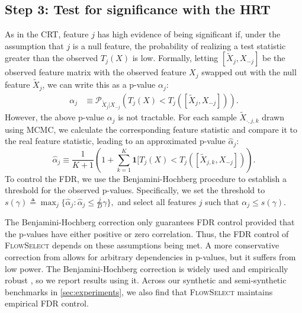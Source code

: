 \documentclass{article}
\newcommand{\FlowSelect}{\textsc{FlowSelect}\xspace}
\begin{document}
\subsection*{Step 3: Test for significance with the HRT}
As in the CRT, feature $j$ has high evidence of being significant if,
under the assumption that $j$ is a null feature,
the probability of realizing a test statistic greater than the observed $T_j(X)$ is low.
Formally, letting \([\tilde X_j, X_{-j}]\) be the observed feature matrix with the observed feature $X_j$ swapped out with the null feature $\tilde X_j$, we can write this as a p-value $\alpha_j$:
\begin{equation} \label{eq:p_value}
\begin{split}
      \alpha_{j} &\equiv \mathcal P_{\tilde X_j | X_{-j}} \left (T_{j}(X) < T_{j} ([\tilde X_j, X_{-j}])\right).
\end{split}
\end{equation}
However, the above p-value $\alpha_j$ is not tractable.
For each sample $\tilde X_{\cdot, j, k}$ drawn using MCMC, we calculate the corresponding feature statistic
and compare it to the real feature statistic, leading to an approximated p-value $\hat \alpha_j$:
\begin{equation}
    \label{eq:empirical_p_value}
    \hat \alpha_{j} \equiv \frac 1 {K+1} ( 1 + \sum_{k=1}^K \mathbf 1[T_j(X) < T_{j} ([\tilde X_{j, k}, X_{-j}])).
  \end{equation}
  To control the FDR, we use the Benjamini-Hochberg procedure to establish a threshold for the observed p-values.
  Specifically, we set the threshold to
\(
s(\gamma) \triangleq \max_j \{\hat \alpha_{j} : \hat \alpha_j \le \frac{j}{D} \gamma \},
\)
and select all features $j$ such that $\alpha_j \leq s(\gamma)$.




The Benjamini-Hochberg correction only guarantees FDR control provided that the p-values have either positive or zero correlation.
Thus, the FDR control of \FlowSelect depends on these assumptions being met.
A more conservative correction from \citet{benjaminiControlFalseDiscovery2001} allows for arbitrary dependencies in p-values, but it suffers from low power.
The Benjamini-Hochberg correction is widely used and empirically robust \citep{tanseyHoldoutRandomizationTest2019}, so we report results using it.
Across our synthetic and semi-synthetic benchmarks in \cref{sec:experiments}, we also find that \FlowSelect maintains empirical FDR control.
\end{document}
